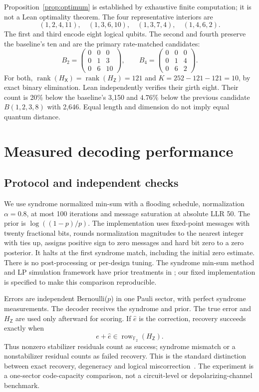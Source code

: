 \documentclass[11pt]{article}
\theoremstyle{definition}
\theoremstyle{remark}
\newcommand{\Ftwo}{\mathbb F_2}
\newcommand{\HX}{H_{\mathsf X}}
\newcommand{\HZ}{H_{\mathsf Z}}
\newcommand{\row}{\operatorname{row}}
\newcommand{\rank}{\operatorname{rank}}
\begin{document}
Proposition~\ref{prop:optimum} is established by exhaustive finite
computation; it is not a Lean optimality theorem. The four representative
interiors are
\[
 (1,2,4,11),\quad(1,3,6,10),\quad(1,3,7,4),\quad(1,4,6,2).
\]
The first and third encode eight logical qubits. The second and fourth
preserve the baseline's ten and are the primary rate-matched candidates:
\begin{equation}\label{eq:candidates}
 B_2=\begin{pmatrix}0&0&0\\0&1&3\\0&6&10\end{pmatrix},\qquad
 B_4=\begin{pmatrix}0&0&0\\0&1&4\\0&6&2\end{pmatrix}.
\end{equation}
For both, $\rank(\HX)=\rank(\HZ)=121$ and
$K=252-121-121=10$, by exact binary elimination. Lean independently
verifies their girth eight. Their count is 20\% below the baseline's
3,150 and $4.76\%$ below the previous candidate
$B(1,2,3,8)$ with 2,646. Equal length and dimension do not imply
equal quantum distance.

\section{Measured decoding performance}\label{sec:decoding}

\subsection{Protocol and independent checks}
We use syndrome normalized min-sum with a flooding schedule,
normalization $\alpha=0.8$, at most 100 iterations and message saturation
at absolute LLR 50. The prior is $\log((1-p)/p)$. The implementation
uses fixed-point messages with twenty fractional bits, rounds
normalization magnitudes to the nearest integer with ties up, assigns
positive sign to zero messages and hard bit zero to a zero posterior.
It halts at the first syndrome match, including the initial zero estimate.
There is no post-processing or per-design tuning. The syndrome min-sum
method and LP simulation framework have prior treatments in
\cite{Raveendran2022,Raveendran2023}; our fixed implementation is
specified to make this comparison reproducible.

Errors are independent Bernoulli($p$) in one Pauli sector, with perfect
syndrome measurements. The decoder receives the syndrome and prior.
The true error and $\HZ$ are used only afterward for scoring. If
$\hat e$ is the correction, recovery succeeds exactly when
\begin{equation}\label{eq:success}
 e+\hat e\in\row_{\Ftwo}(\HZ).
\end{equation}
Thus nonzero stabilizer residuals count as success; syndrome mismatch
or a nonstabilizer residual counts as failed recovery. This is the
standard distinction between exact recovery, degeneracy and logical
miscorrection~\cite{MPK2026}. The experiment is a one-sector
code-capacity comparison, not a circuit-level or depolarizing-channel
benchmark.
\end{document}
